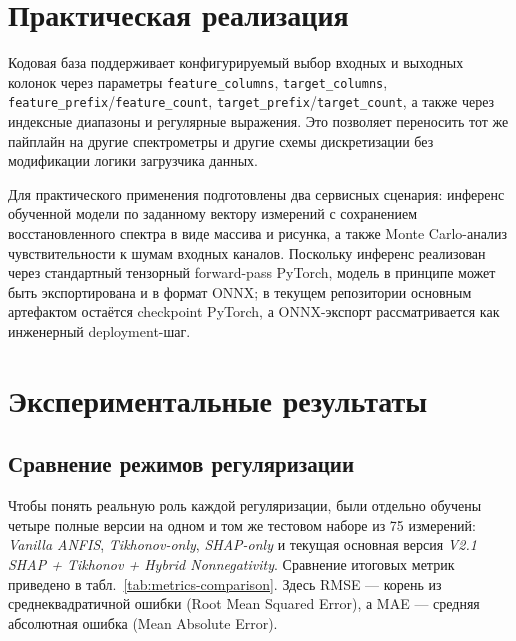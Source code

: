 \section{Практическая реализация}

Кодовая база поддерживает конфигурируемый выбор входных и выходных колонок через параметры \texttt{feature\_columns}, \texttt{target\_columns}, \texttt{feature\_prefix}/\texttt{feature\_count}, \texttt{target\_prefix}/\texttt{target\_count}, а также через индексные диапазоны и регулярные выражения. Это позволяет переносить тот же пайплайн на другие спектрометры и другие схемы дискретизации без модификации логики загрузчика данных.

Для практического применения подготовлены два сервисных сценария: инференс обученной модели по заданному вектору измерений с сохранением восстановленного спектра в виде массива и рисунка, а также Monte Carlo-анализ чувствительности к шумам входных каналов. Поскольку инференс реализован через стандартный тензорный forward-pass PyTorch, модель в принципе может быть экспортирована и в формат ONNX; в текущем репозитории основным артефактом остаётся checkpoint PyTorch, а ONNX-экспорт рассматривается как инженерный deployment-шаг.

\section{Экспериментальные результаты}

\subsection{Сравнение режимов регуляризации}

Чтобы понять реальную роль каждой регуляризации, были отдельно обучены четыре полные версии на одном и том же тестовом наборе из 75 измерений: \textit{Vanilla ANFIS}, \textit{Tikhonov-only}, \textit{SHAP-only} и текущая основная версия \textit{V2.1 SHAP + Tikhonov + Hybrid Nonnegativity}. Сравнение итоговых метрик приведено в табл.~\ref{tab:metrics-comparison}. Здесь RMSE --- корень из среднеквадратичной ошибки (Root Mean Squared Error), а MAE --- средняя абсолютная ошибка (Mean Absolute Error).

\begin{table}[htbp]
\centering
\small
{}
\caption{Полное сравнение режимов регуляризации на одинаковом тестовом наборе. Для компактности числа округлены.}
\label{tab:metrics-comparison}
\end{table}

